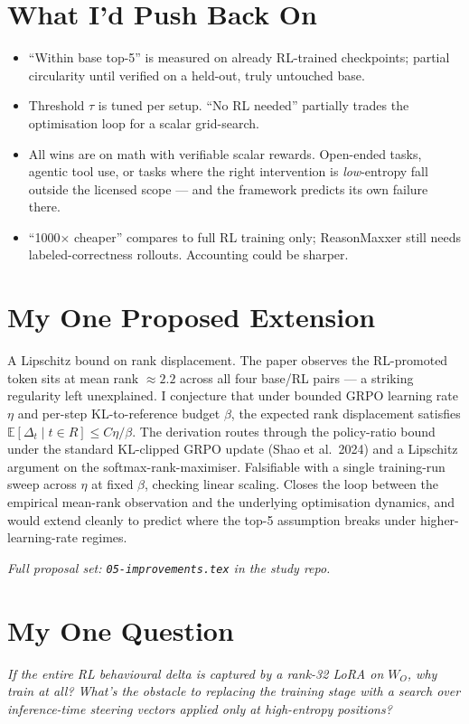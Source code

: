 \documentclass[10pt]{article}
\begin{document}
\section*{What I'd Push Back On}
\begin{itemize}
  \item ``Within base top-5'' is measured on already RL-trained checkpoints; partial circularity until verified on a held-out, truly untouched base.
  \item Threshold $\tau$ is tuned per setup. ``No RL needed'' partially trades the optimisation loop for a scalar grid-search.
  \item All wins are on math with verifiable scalar rewards. Open-ended tasks, agentic tool use, or tasks where the right intervention is \emph{low}-entropy fall outside the licensed scope --- and the framework predicts its own failure there.
  \item ``1000$\times$ cheaper'' compares to full RL training only; ReasonMaxxer still needs labeled-correctness rollouts. Accounting could be sharper.
\end{itemize}

\section*{My One Proposed Extension}
A Lipschitz bound on rank displacement. The paper observes the RL-promoted token sits at mean rank $\approx 2.2$ across all four base/RL pairs --- a striking regularity left unexplained. I conjecture that under bounded GRPO learning rate $\eta$ and per-step KL-to-reference budget $\beta$, the expected rank displacement satisfies $\mathbb{E}[\Delta_t \mid t \in R] \leq C\eta/\beta$. The derivation routes through the policy-ratio bound under the standard KL-clipped GRPO update (Shao et al.\ 2024) and a Lipschitz argument on the softmax-rank-maximiser. Falsifiable with a single training-run sweep across $\eta$ at fixed $\beta$, checking linear scaling. Closes the loop between the empirical mean-rank observation and the underlying optimisation dynamics, and would extend cleanly to predict where the top-5 assumption breaks under higher-learning-rate regimes.

\emph{Full proposal set: \texttt{05-improvements.tex} in the study repo.}

\section*{My One Question}
\emph{If the entire RL behavioural delta is captured by a rank-32 LoRA on $W_O$, why train at all? What's the obstacle to replacing the training stage with a search over inference-time steering vectors applied only at high-entropy positions?}
\end{document}
